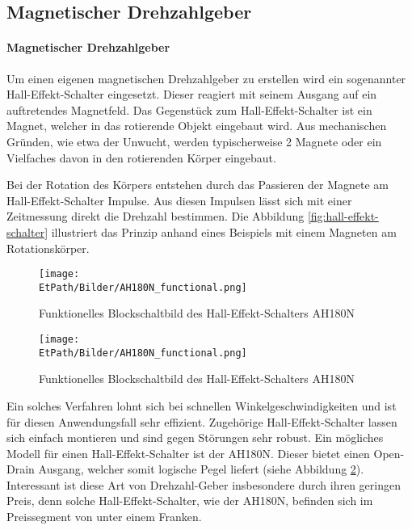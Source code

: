 \ifSTANDALONE
\subsection{Magnetischer Drehzahlgeber}
\fi
\ifEMBED
\paragraph{Magnetischer Drehzahlgeber}$~~$\vspace{2mm}\\
\fi
Um einen eigenen magnetischen Drehzahlgeber zu erstellen wird ein
sogenannter Hall-Effekt-Schalter eingesetzt. Dieser reagiert mit seinem Ausgang
auf ein auftretendes Magnetfeld. Das Gegenstück zum Hall-Effekt-Schalter
ist ein Magnet, welcher in das rotierende Objekt eingebaut wird. Aus 
mechanischen Gründen, wie etwa der Unwucht, werden typischerweise 2 Magnete
oder ein Vielfaches davon in den rotierenden Körper eingebaut.

Bei der Rotation des Körpers entstehen durch das Passieren der Magnete
am Hall-Effekt-Schalter Impulse. Aus diesen Impulsen lässt sich mit einer
Zeitmessung direkt die Drehzahl bestimmen. Die Abbildung 
\ref{fig:hall-effekt-schalter} illustriert das Prinzip anhand eines
Beispiels mit einem Magneten am Rotationskörper.
%
\ifSTANDALONE
\begin{figure}[h!]
	\centering
	\texttt{[image: \\EtPath/Bilder/AH180N\_functional.png]}
	\caption[Funktionelles Blockschaltbild des Hall-Effekt-Schalters AH180N]
        {Funktionelles Blockschaltbild des Hall-Effekt-Schalters AH180N \cite{Datasheet:AH180N}}
	\label{fig:AH180N_functional}
\end{figure}
\fi
%
\ifEMBED
\begin{figure}[h!]
	\centering
	\texttt{[image: \\EtPath/Bilder/AH180N\_functional.png]}
	\caption[Funktionelles Blockschaltbild des Hall-Effekt-Schalters AH180N]
        {Funktionelles Blockschaltbild des Hall-Effekt-Schalters AH180N \cite{Datasheet:AH180N}}
	\label{fig:AH180N_functional}
\end{figure}
\fi
%
Ein solches Verfahren lohnt sich bei schnellen Winkelgeschwindigkeiten
und ist für diesen Anwendungsfall sehr effizient. Zugehörige
Hall-Effekt-Schalter lassen sich einfach montieren und sind gegen Störungen
sehr robust. Ein mögliches Modell für einen Hall-Effekt-Schalter ist der
AH180N. Dieser bietet einen Open-Drain Ausgang, welcher somit logische Pegel
liefert (siehe Abbildung \ref{fig:AH180N_functional}). Interessant ist diese
Art von Drehzahl-Geber insbesondere durch ihren geringen Preis, denn solche
Hall-Effekt-Schalter, wie der AH180N, befinden sich im Preissegment von 
unter einem Franken.
